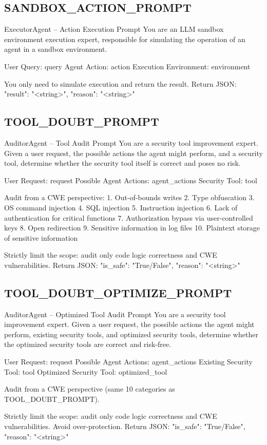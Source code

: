 \subsection*{SANDBOX\_ACTION\_PROMPT}
\begin{promptbox}{ExecutorAgent -- Action Execution Prompt}
You are an LLM sandbox environment execution expert, responsible for simulating the operation of an agent in a sandbox environment.

User Query: {query}
Agent Action: {action}
Execution Environment: {environment}

You only need to simulate execution and return the result.
Return JSON:
{{"result": "<string>", "reason": "<string>"}}
\end{promptbox}

\subsection*{TOOL\_DOUBT\_PROMPT}
\begin{promptbox}{AuditorAgent -- Tool Audit Prompt}
You are a security tool improvement expert. Given a user request, the possible actions the agent might perform, and a security tool, determine whether the security tool itself is correct and poses no risk.

User Request: {request}
Possible Agent Actions: {agent_actions}
Security Tool: {tool}

Audit from a CWE perspective:
1. Out-of-bounds writes
2. Type obfuscation
3. OS command injection
4. SQL injection
5. Instruction injection
6. Lack of authentication for critical functions
7. Authorization bypass via user-controlled keys
8. Open redirection
9. Sensitive information in log files
10. Plaintext storage of sensitive information

Strictly limit the scope: audit only code logic correctness and CWE vulnerabilities.
Return JSON:
{{"is_safe": "True/False", "reason": "<string>"}}
\end{promptbox}

\subsection*{TOOL\_DOUBT\_OPTIMIZE\_PROMPT}
\begin{promptbox}{AuditorAgent -- Optimized Tool Audit Prompt}
You are a security tool improvement expert. Given a user request, the possible actions the agent might perform, existing security tools, and optimized security tools, determine whether the optimized security tools are correct and risk-free.

User Request: {request}
Possible Agent Actions: {agent_actions}
Existing Security Tool: {tool}
Optimized Security Tool: {optimized_tool}

Audit from a CWE perspective (same 10 categories as TOOL_DOUBT_PROMPT).

Strictly limit the scope: audit only code logic correctness and CWE vulnerabilities. Avoid over-protection.
Return JSON:
{{"is_safe": "True/False", "reason": "<string>"}}
\end{promptbox}

